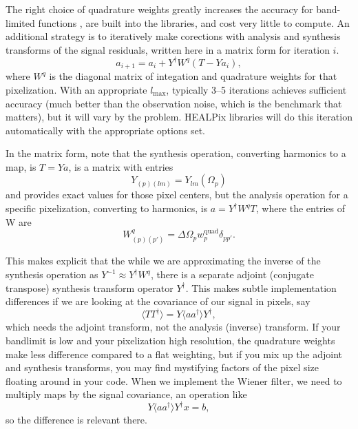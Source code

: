 The right choice of quadrature weights greatly increases the accuracy for band-limited functions \citep{2013A&A...554A.112R}, are built into the libraries, and cost very little to compute.  An additional strategy is to iteratively make corections with analysis and synthesis transforms of the signal residuals, written here in a matrix form for iteration $i$.
\begin{equation}
    a_{i+1} = a_{i} + Y^{\dag} W^q (T - Y a_{i}),
\end{equation}
where $W^q$ is the diagonal matrix of integation and quadrature weights for that pixelization.  With an appropriate $l_\textrm{max}$, typically 3--5 iterations achieves sufficient accuracy (much better than the observation noise, which is the benchmark that matters), but it will vary by the problem.  HEALPix libraries will do this iteration automatically with the appropriate options set.

In the matrix form, note that the synthesis operation, converting harmonics to a map, is $T = Ya$, is a matrix with entries
\begin{equation}
  Y_{(p)(lm)} = Y_{lm}(\Omega_p)
\end{equation}
and provides exact values for those pixel centers, but the analysis operation for a specific pixelization, converting to harmonics, is $a = Y^{\dag}W^q T$, where the entries of W are
\begin{equation}
  W^q_{(p)(p')} = \Delta\Omega_p w^\textrm{quad}_p \delta_{pp'}.
\end{equation}

This makes explicit that the while we are approximating the inverse of the synthesis operation as $Y^{-1} \approx Y^{\dag} W^q$, there is a separate adjoint (conjugate transpose) synthesis transform operator $Y^{\dag}$.  This makes subtle implementation differences if we are looking at the covariance of our signal in pixels, say
\begin{equation}
  \langle TT^\dag \rangle = Y \langle a a^\dag \rangle Y^\dag,
\end{equation}
which needs the adjoint transform, not the analysis (inverse) transform.  If your bandlimit is low and your pixelization high resolution, the quadrature weights make less difference compared to a flat weighting, but if you mix up the adjoint and synthesis transforms, you may find mystifying factors of the pixel size floating around in your code.  When we implement the Wiener filter, we need to multiply maps by the signal covariance, an operation like
\begin{equation}
Y \langle a a^\dag \rangle Y^\dag x  = b,
\end{equation}
so the difference  is relevant there.

